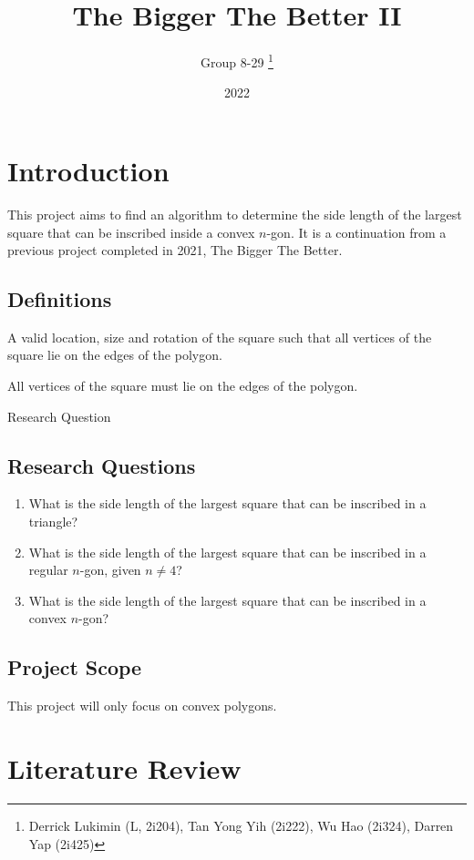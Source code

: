 \documentclass[12pt]{scrartcl}
\title{The Bigger The Better II}
\author{Group 8-29 \thanks{Derrick Lukimin (L, 2i204), Tan Yong Yih (2i222), Wu Hao (2i324), Darren Yap (2i425)}}
\date{2022}
\begin{document}
\onehalfspacing
\maketitle
\tableofcontents

\section{Introduction}
This project aims to find an algorithm to determine
the side length of the largest square that can be
inscribed inside a convex $n$-gon. It is a continuation from
a previous project completed in 2021, The Bigger The Better. \cite{tbtb1}

\subsection{Definitions}
\begin{description}[font=\bfseries, leftmargin=1cm, style=nextline]
	\item[placement] A valid location, size and rotation of the square such that
		all vertices of the square lie on the edges of the polygon.
	\item[inscribed] All vertices of the square must lie on the edges of the polygon.
	\item[RQ] Research Question
\end{description}

\subsection{Research Questions}
\begin{enumerate}
	\item What is the side length of the largest square that can be inscribed in a triangle?
	\item What is the side length of the largest square that can be inscribed in a regular $n$-gon, given $n \neq 4$?
	\item What is the side length of the largest square that can be inscribed in a convex $n$-gon?
\end{enumerate}

\subsection{Project Scope}
This project will only focus on convex polygons.

\section{Literature Review}
\end{document}
